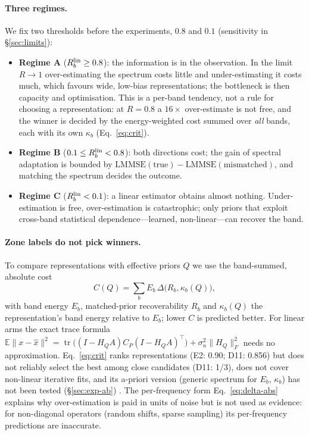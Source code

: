 \paragraph{Three regimes.} We fix two thresholds before the experiments,
$0.8$ and $0.1$ (sensitivity in \S\ref{sec:limits}):
\begin{itemize}
\item \textbf{Regime A} ($R_b^{\mathrm{lin}}\ge0.8$): the information is in the
observation. In the limit $R\to1$ over-estimating the spectrum costs
little and under-estimating it costs much, which favours wide, low-bias
representations; the bottleneck is then capacity and optimisation. This is a
per-band tendency, not a rule for choosing a representation: at $R=0.8$ a
$16\times$ over-estimate is not free, and the winner is decided by the
energy-weighted cost summed over \emph{all} bands, each with its own
$\kappa_b$ (Eq.~\eqref{eq:crit}).
\item \textbf{Regime B} ($0.1\le R_b^{\mathrm{lin}}<0.8$): both directions cost; the gain of
spectral adaptation is bounded by
$\mathrm{LMMSE}(\text{true})-\mathrm{LMMSE}(\text{mismatched})$, and
matching the spectrum decides the outcome.
\item \textbf{Regime C} ($R_b^{\mathrm{lin}}<0.1$): a linear estimator obtains almost
nothing. Under-estimation is free, over-estimation is catastrophic; only
priors that exploit cross-band statistical dependence---learned,
non-linear---can recover the band.
\end{itemize}

\paragraph{Zone labels do not pick winners.} To compare representations with
effective priors $Q$ we use the band-summed, absolute cost
\begin{equation}\label{eq:crit}
C(Q)=\sum_b E_b\,\Delta\big(R_b,\kappa_b(Q)\big),
\end{equation}
with band energy $E_b$, matched-prior recoverability $R_b$ and
$\kappa_b(Q)$ the representation's band energy relative to $E_b$; lower $C$
is predicted better. For linear arms the exact trace formula
$\mathbb{E}\|x-\hat x\|^2=\operatorname{tr}\!\big((I-H_QA)C_P(I-H_QA)^\top\big)+\sigma_n^2\|H_Q\|_F^2$
needs no approximation. Eq.~\eqref{eq:crit} ranks representations
(E2: 0.90; D11: 0.856) but does not reliably select the best among close
candidates (D11: 1/3), does not cover non-linear iterative fits, and its
a-priori version (generic spectrum for $E_b$, $\kappa_b$) has not been tested
(\S\ref{sec:exp-ab}) . The per-frequency form
Eq.~\eqref{eq:delta-abs} explains why over-estimation is paid in units of
noise but is not used as evidence: for non-diagonal operators (random shifts,
sparse sampling) its per-frequency predictions are inaccurate.

